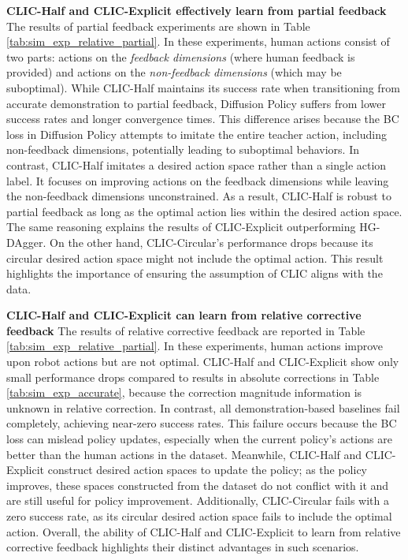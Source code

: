 \textbf{CLIC-Half and CLIC-Explicit effectively learn from partial feedback}
The results of partial feedback experiments are shown in Table \ref{tab:sim_exp_relative_partial}.
In these experiments, human actions consist of two parts: actions on the \textit{feedback dimensions} (where human feedback is provided) and actions on the \textit{non-feedback dimensions} (which may be suboptimal).
While CLIC-Half maintains its success rate when transitioning from accurate demonstration to partial feedback, Diffusion Policy suffers from lower success rates and longer convergence times.  
This difference arises because the BC loss in Diffusion Policy attempts to imitate the entire teacher action, including non-feedback dimensions, potentially leading to suboptimal behaviors.
In contrast, CLIC-Half imitates a desired action space rather than a single action label.
It focuses on improving actions on the feedback dimensions while leaving the non-feedback dimensions unconstrained. 
As a result, CLIC-Half is robust to partial feedback as long as the optimal action lies within the desired action space.
The same reasoning explains the results of CLIC-Explicit outperforming HG-DAgger.
On the other hand, CLIC-Circular's performance drops because its circular desired action space might not include the optimal action. 
This result highlights the importance of ensuring the assumption of CLIC aligns with the data. 

\textbf{CLIC-Half and CLIC-Explicit can learn from relative corrective feedback}
The results of relative corrective feedback are reported in Table  \ref{tab:sim_exp_relative_partial}. 
In these experiments, human actions improve upon robot actions but are not optimal.
CLIC-Half and CLIC-Explicit show only small performance drops compared to results in absolute corrections in Table \ref{tab:sim_exp_accurate}, because the correction magnitude information is unknown in relative correction.
In contrast, all demonstration-based baselines fail completely, achieving near-zero success rates. 
This failure occurs because the BC loss can mislead policy updates, especially when the current policy’s actions are better than the human actions in the dataset. 
Meanwhile, CLIC-Half and CLIC-Explicit construct desired action spaces to update the policy; as the policy improves, these spaces constructed from the dataset do not conflict with it and are still useful for policy improvement. 
Additionally, CLIC-Circular fails with a zero success rate, as its circular desired action space fails to include the optimal action.
Overall, the ability of CLIC-Half and CLIC-Explicit to learn from relative corrective feedback highlights their distinct advantages in such scenarios.



